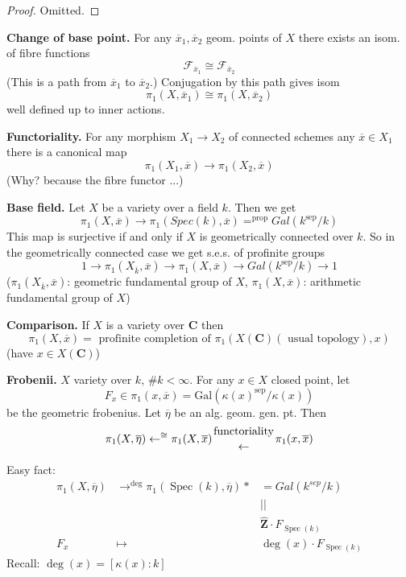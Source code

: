 \documentclass{stacks-project}
\theoremstyle{plain}
\theoremstyle{definition}
\theoremstyle{remark}
\numberwithin{equation}{subsection}
\def\Spec{\mathop{\mathrm{Spec}}}
\begin{document}
\begin{proof}
Omitted.
\end{proof}

\noindent
{\bf Change of base point.} For any $\overline{x}_1, \overline{x}_2$
geom. points of $X$ there exists an isom. of fibre functions
$$
\mathcal{F}_{\overline{x}_1} \cong \mathcal{F}_{\overline{x}_2}
$$
(This is a path from $\overline{x}_1$ to $\overline{x}_2$.) Conjugation
by this path gives isom
$$
\pi_1(X, \overline{x}_1) \cong \pi_1(X, \overline{x}_2)
$$
well defined up to inner actions.

\medskip\noindent
{\bf Functoriality.} For any morphism $X_1\to X_2$ of connected schemes
any $\overline{x}\in X_1$ there is a canonical map
$$
\pi_1(X_1, \overline{x}) \to \pi_1(X_2, \overline{x})
$$
(Why? because the fibre functor ...)

\medskip\noindent
{\bf Base field.} Let $X$ be a variety over a field $k$. Then we get
$$
\pi_1(X, \overline{x}) \to
\pi_1(Spec(k), \overline{x}) =^{\text{prop}} Gal(k^{\text{sep}}/k)
$$
This map is surjective if and only if $X$ is geometrically connected over $k$.
So in the geometrically connected case we get s.e.s. of profinite
groups
$$
1 \to \pi_1(X_{\overline{k}}, \overline{x}) \to
\pi_1(X, \overline{x}) \to
Gal(k^{\text{sep}}/k) \to 1
$$
($\pi_1(X_{\overline{k}}, \overline{x})$: geometric fundamental group of
$X$, $\pi_1(X, \overline{x})$: arithmetic fundamental group of $X$)

\medskip\noindent
{\bf Comparison.} If $X$ is a variety over $\mathbf{C}$ then
$$
\pi_1(X, \overline{x}) =
\text{ profinite completion of }
\pi_1(X(\mathbf{C})(\text{ usual topology}), x)
$$
(have $x\in X(\mathbf{C})$)

\medskip\noindent
{\bf Frobenii.} $X$ variety over $k$, $\# k < \infty$. For any $x \in X$
closed point, let
$$
F_x\in \pi_1(x, \overline{x}) =
\text{Gal}(\kappa(x)^{\text{sep}}/\kappa(x))
$$
be the geometric frobenius.
Let $\overline\eta$ be an alg. geom. gen. pt. Then
$$
\pi_1(X, \overline\eta) \leftarrow^{\cong}
\pi_1(X, \overline{x})
{\text{functoriality} \atop \leftarrow} \pi_1(x, \overline{x})
$$

\noindent
Easy fact:
$$
\begin{matrix}
\pi_1(X, \overline \eta) & \to^{\deg} \pi_1(\Spec(k), \overline \eta) * &
= Gal(k^{sep}/k) \\
& & || \\
& & \widehat{\mathbf{Z}}\cdot F_{\Spec(k)} \\
F_x & \mapsto & \deg(x)\cdot F_{\Spec(k)}
\end{matrix}
$$
Recall: $\deg(x) = [\kappa(x):k]$
\end{document}

